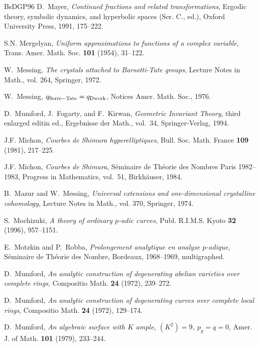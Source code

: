 \begin{thebibliography}{BsDGP96}
D.~Mayer, \emph{Continued fractions and related transformations}, Ergodic
  theory, symbolic dynamics, and hyperbolic spaces (Ser. C., ed.), Oxford
  University Press, 1991, 175--222.

S.N. Mergelyan, \emph{Uniform approximations to functions of a complex
  variable}, Trans. Amer. Math. Soc. \textbf{101} (1954), 31--122.

W.~Messing, \emph{The crystals attached to Barsotti-Tate groups}, Lecture Notes
  in Math., vol. 264, Springer, 1972.

W.~Messing, \emph{$q_{\rm Serre-Tate}=q_{\rm Dwork}$}, Notices Amer. Math.
  Soc., 1976.

D.~Mumford, J.~Fogarty, and F.~Kirwan, \emph{Geometric {I}nvariant {T}heory},
  third enlarged editin ed., Ergebnisse der Math., vol.~34, Springer-Verlag,
  1994.

J.F. Michon, \emph{Courbes de {S}himura hyperelliptiques}, Bull. Soc. Math.
  France \textbf{109} (1981), 217--225.

J.F. Michon, \emph{Courbes de {S}himura}, S\'eminaire de Th\'eorie des Nombres
  Paris 1982--1983, Progress in Mathematics, vol.~51, Birkh\"auser, 1984.

B.~Mazur and W.~Messing, \emph{Universal extensions and one-dimensional
  crystalline cohomology}, Lecture Notes in Math., vol. 370, Springer, 1974.

S.~Mochizuki, \emph{A theory of ordinary $p$-adic curves}, Publ. R.I.M.S. Kyoto
  \textbf{32} (1996), 957--1151.

E.~Motzkin and P.~Robba, \emph{Prolongement analytique en analyse $p$-adique},
  S\'eminaire de Th\'eorie des Nombre, Bordeaux, 1968--1969, multigraphed.

D.~Mumford, \emph{An analytic construction of degenerating abelian varieties
  over complete rings}, Compositio Math. \textbf{24} (1972), 239--272.

D.~Mumford, \emph{An analytic construction of degenerating curves over complete
  local rings}, Compositio Math. \textbf{24} (1972), 129--174.

D.~Mumford, \emph{An algebraic surface with ${K}$ ample, $({K}^2)=9$,
  $p_g=q=0$}, Amer. J. of Math. \textbf{101} (1979), 233--244.


\end{thebibliography}
